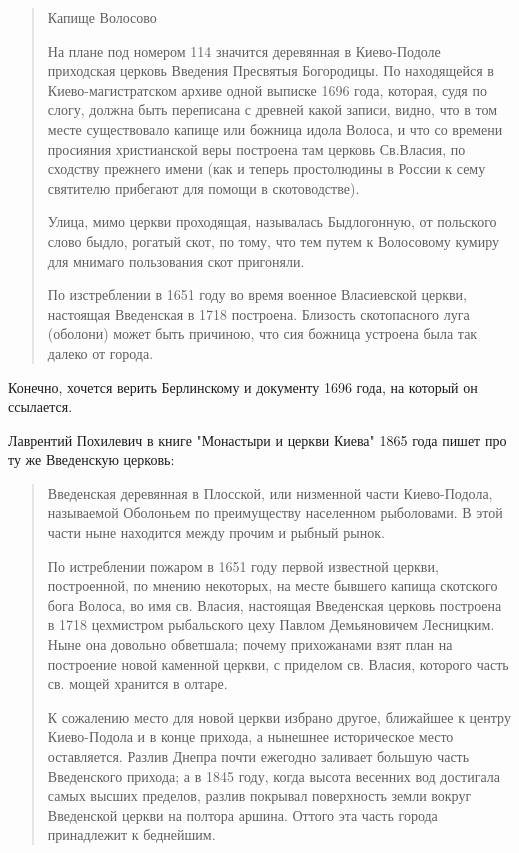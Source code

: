 \documentclass[a5paper,11pt,openany]{article}
\begin{document}
\begin{quotation}
\noindent Капище Волосово

На плане под номером 114 значится деревянная в Киево-Подоле приходская церковь Введения Пресвятыя Богородицы. По находящейся в Киево-магистратском архиве одной выписке 1696 года, которая, судя по слогу, должна быть переписана с древней какой записи, видно, что в том месте существовало капище или божница идола Волоса, и что со времени просияния христианской веры построена там церковь Св.Власия, по сходству прежнего имени (как и теперь простолюдины в России к сему святителю прибегают для помощи в скотоводстве).

  Улица, мимо церкви проходящая, называлась Быдлогонную, от польского слово быдло, рогатый скот, по тому, что тем путем к Волосовому кумиру для мнимаго пользования скот пригоняли.

   По изстреблении в 1651 году во время военное Власиевской церкви, настоящая Введенская в 1718 построена. Близость скотопасного луга (оболони) может быть причиною, что сия божница устроена была так далеко от города.
\end{quotation}

   Конечно, хочется верить Берлинскому и документу 1696 года, на который он ссылается.  

  Лаврентий Похилевич в книге "Монастыри и церкви Киева" 1865 года пишет про ту же Введенскую церковь:

\begin{quotation}
\noindent Введенская деревянная в Плосской, или низменной части Киево-Подола, называемой Оболоньем по преимуществу населенном рыболовами. В этой части ныне находится между прочим и рыбный рынок.

По истреблении пожаром в 1651 году первой известной церкви, построенной, по мнению некоторых, на месте бывшего капища скотского бога Волоса, во имя св. Власия, настоящая Введенская церковь построена в 1718 цехмистром рыбальского цеху Павлом Демьяновичем Лесницким. Ныне она довольно обветшала; почему прихожанами взят план на построение новой каменной церкви, с приделом св. Власия, которого часть св. мощей хранится в олтаре.

К сожалению место для новой церкви избрано другое, ближайшее к центру Киево-Подола и в конце прихода, а нынешнее историческое место оставляется. Разлив Днепра почти ежегодно заливает большую часть Введенского прихода; а в 1845 году, когда высота весенних вод достигала самых высших пределов, разлив покрывал поверхность земли вокруг Введенской церкви на полтора аршина. Оттого эта часть города принадлежит к беднейшим.\end{quotation}
\end{document}
